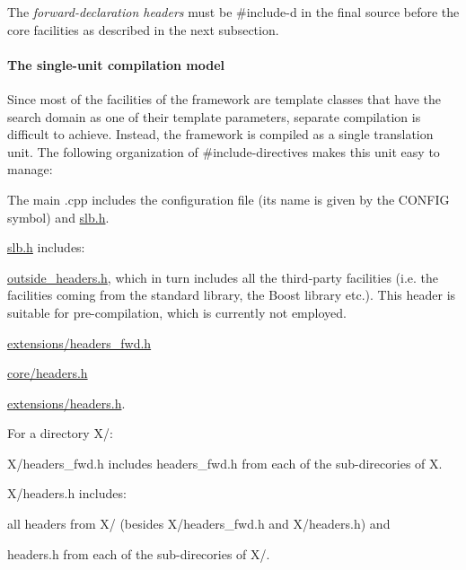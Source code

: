 The {\itshape forward-\/declaration headers} must be {\ttfamily \#include}-\/d in the final source before the core facilities as described in the next subsection.\hypertarget{index_s-single-unit}{}\paragraph{The single-\/unit compilation model}\label{index_s-single-unit}
Since most of the facilities of the framework are template classes that have the search domain as one of their template parameters, separate compilation is difficult to achieve. Instead, the framework is compiled as a single translation unit. The following organization of {\ttfamily \#include}-\/directives makes this unit easy to manage\+:
\begin{DoxyItemize}
\item The main {\ttfamily .cpp} includes the configuration file (its name is given by the {\ttfamily C\+O\+N\+F\+IG} symbol) and {\ttfamily \hyperlink{slb_8h_source}{slb.\+h}}.
\item {\ttfamily \hyperlink{slb_8h_source}{slb.\+h}} includes\+:
\begin{DoxyItemize}
\item {\ttfamily \hyperlink{outside__headers_8h}{outside\+\_\+headers.\+h}}, which in turn includes all the third-\/party facilities (i.\+e. the facilities coming from the standard library, the {\ttfamily Boost} library etc.). This header is suitable for pre-\/compilation, which is currently not employed.
\item {\ttfamily \hyperlink{headers__fwd_8h}{extensions/headers\+\_\+fwd.\+h}}
\item {\ttfamily \hyperlink{core_2headers_8h}{core/headers.\+h}}
\item {\ttfamily \hyperlink{extensions_2headers_8h}{extensions/headers.\+h}}.
\end{DoxyItemize}
\item For a directory {\ttfamily X/}\+:
\begin{DoxyItemize}
\item {\ttfamily X/headers\+\_\+fwd.\+h} includes {\ttfamily headers\+\_\+fwd.\+h} from each of the sub-\/direcories of {\ttfamily X}.
\item {\ttfamily X/headers.\+h} includes\+:
\begin{DoxyItemize}
\item all headers from {\ttfamily X/} (besides {\ttfamily X/headers\+\_\+fwd.\+h} and {\ttfamily X/headers.\+h}) and
\item {\ttfamily headers.\+h} from each of the sub-\/direcories of {\ttfamily X/}.
\end{DoxyItemize}
\end{DoxyItemize}
\end{DoxyItemize}

